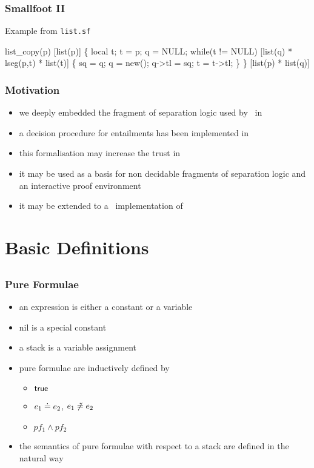 \begin{frame}[fragile]
\frametitle{Smallfoot II}

\begin{exampleblock}{Example from \texttt{list.sf}}
\begin{semiverbatim}
list_copy(p) [list(p)] \{
  local t;
  t = p;
  q = NULL;
  while(t != NULL) [list(q) * lseg(p,t) * list(t)] \{
    sq = q;
    q = new();
    q->tl = sq;
    t = t->tl;
  \}
\} [list(p) * list(q)]
\end{semiverbatim}
\end{exampleblock}
\end{frame}


\begin{frame}
\frametitle{Motivation}
\begin{itemize}
\item we deeply embedded the fragment of separation logic used by \smallfoot\
  in \HOL
\item a decision procedure for entailments has been implemented in \HOL
\item this formalisation may increase the trust in \smallfoot
\item it may be used as a basis for non decidable fragments of separation
  logic and an interactive proof environment
\item it may be extended to a \HOL\ implementation of \smallfoot 
\end{itemize}
\end{frame}


\section{Basic Definitions}
\subsection*{}

\begin{frame}
\frametitle{Pure Formulae}
\begin{itemize}
\item an \alert{expression} is either a constant or a variable
\item \alert{nil} is a special constant
\item a \alert{stack} is a variable assignment
\item \alert{pure formulae} are inductively defined by
\begin{itemize}
\item ${\textsf{true}}$ 
\item $e_1 \doteq e_2$,  $e_1 \not\doteq e_2$ 
\item $pf_1 \wedge pf_2$
\end{itemize}
\item the semantics of pure formulae with respect to a stack are defined in
  the natural way
\end{itemize}
\end{frame}


